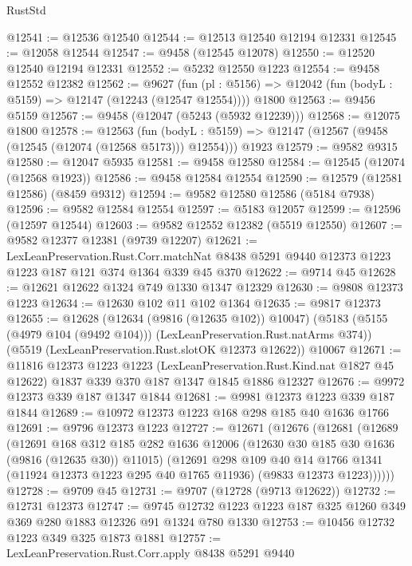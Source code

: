\begin{lexlean}{RustStd}
\begin{coremodule}
@12541 := @12536 @12540
@12544 := @12513 @12540 @12194 @12331
@12545 := @12058 @12544
@12547 := @9458 (@12545 @12078)
@12550 := @12520 @12540 @12194 @12331
@12552 := @5232 @12550 @1223
@12554 := @9458 @12552 @12382
@12562 := @9627
    (fun (pl : @5156) => @12042 (fun (bodyL : @5159) => @12147 (@12243 (@12547 @12554))))
    @1800
@12563 := @9456 @5159
@12567 := @9458 (@12047 (@5243 (@5932 @12239)))
@12568 := @12075 @1800
@12578 := @12563
    (fun (bodyL : @5159) => @12147 (@12567 (@9458 (@12545 (@12074 (@12568 @5173))) @12554)))
    @1923
@12579 := @9582 @9315
@12580 := @12047 @5935
@12581 := @9458 @12580
@12584 := @12545 (@12074 (@12568 @1923))
@12586 := @9458 @12584 @12554
@12590 := @12579 (@12581 @12586) (@8459 @9312)
@12594 := @9582 @12580 @12586 (@5184 @7938)
@12596 := @9582 @12584 @12554
@12597 := @5183 @12057
@12599 := @12596 (@12597 @12544)
@12603 := @9582 @12552 @12382 (@5519 @12550)
@12607 := @9582 @12377 @12381 (@9739 @12207)
@12621 := LexLeanPreservation.Rust.Corr.matchNat
    @8438
    @5291
    @9440
    @12373
    @1223
    @1223
    @187
    @121
    @374
    @1364
    @339
    @45
    @370
@12622 := @9714 @45
@12628 := @12621 @12622 @1324 @749 @1330 @1347 @12329
@12630 := @9808 @12373 @1223
@12634 := @12630 @102 @11 @102 @1364
@12635 := @9817 @12373
@12655 := @12628
    (@12634 (@9816 (@12635 @102)) @10047)
    (@5183 (@5155 (@4979 @104 (@9492 @104))) (LexLeanPreservation.Rust.natArms @374))
    (@5519 (LexLeanPreservation.Rust.slotOK @12373 @12622))
    @10067
@12671 := @11816
    @12373
    @1223
    @1223
    (LexLeanPreservation.Rust.Kind.nat @1827 @45 @12622)
    @1837
    @339
    @370
    @187
    @1347
    @1845
    @1886
    @12327
@12676 := @9972 @12373 @339 @187 @1347 @1844
@12681 := @9981 @12373 @1223 @339 @187 @1844
@12689 := @10972 @12373 @1223 @168 @298 @185 @40 @1636 @1766
@12691 := @9796 @12373 @1223
@12727 := @12671
    (@12676
      (@12681
        (@12689
          (@12691
            @168
            @312
            @185
            @282
            @1636
            @12006
            (@12630 @30 @185 @30 @1636 (@9816 (@12635 @30)) @11015)
            (@12691
              @298
              @109
              @40
              @14
              @1766
              @1341
              (@11924 @12373 @1223 @295 @40 @1765 @11936)
              (@9833 @12373 @1223))))))
@12728 := @9709 @45
@12731 := @9707 (@12728 (@9713 @12622))
@12732 := @12731 @12373
@12747 := @9745 @12732 @1223 @1223 @187 @325 @1260 @349 @369 @280 @1883 @12326 @91 @1324 @780 @1330
@12753 := @10456 @12732 @1223 @349 @325 @1873 @1881
@12757 := LexLeanPreservation.Rust.Corr.apply @8438 @5291 @9440

\end{coremodule}
\end{lexlean}
